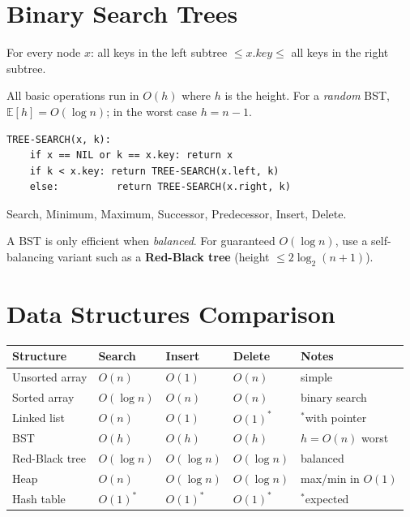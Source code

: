 \documentclass[11pt,a4paper,openany]{book}
\begin{document}
\section{Binary Search Trees}

\begin{defnbox}[title=BST property]
For every node $x$: all keys in the left subtree $\leq x.\mathit{key} \leq$ all keys in
the right subtree.
\end{defnbox}

All basic operations run in $O(h)$ where $h$ is the height.
For a \emph{random} BST, $\mathbb{E}[h] = O(\log n)$; in the worst case $h = n-1$.

\begin{lstlisting}
TREE-SEARCH(x, k):
    if x == NIL or k == x.key: return x
    if k < x.key: return TREE-SEARCH(x.left, k)
    else:          return TREE-SEARCH(x.right, k)
\end{lstlisting}

\begin{propbox}[title=Operations — all $O(h)$]
Search, Minimum, Maximum, Successor, Predecessor, Insert, Delete.
\end{propbox}

\begin{warnbox}
A BST is only efficient when \emph{balanced}. For guaranteed $O(\log n)$, use a
self-balancing variant such as a \textbf{Red-Black tree} (height $\leq 2\log_2(n+1)$).
\end{warnbox}

\section{Data Structures Comparison}

\begin{center}
\begin{tabular}{lllll}
\toprule
Structure    & Search    & Insert      & Delete      & Notes \\
\midrule
Unsorted array & $O(n)$  & $O(1)$      & $O(n)$      & simple \\
Sorted array   & $O(\log n)$ & $O(n)$  & $O(n)$      & binary search \\
Linked list    & $O(n)$  & $O(1)$      & $O(1)^*$    & $^*$with pointer \\
BST            & $O(h)$  & $O(h)$      & $O(h)$      & $h = O(n)$ worst \\
Red-Black tree & $O(\log n)$ & $O(\log n)$ & $O(\log n)$ & balanced \\
Heap           & $O(n)$  & $O(\log n)$ & $O(\log n)$ & max/min in $O(1)$ \\
Hash table     & $O(1)^*$& $O(1)^*$    & $O(1)^*$    & $^*$expected \\
\bottomrule
\end{tabular}
\end{center}
\end{document}
